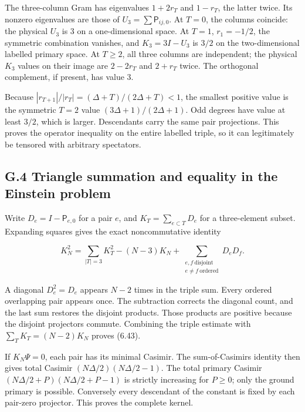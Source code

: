 The three-column Gram has eigenvalues \(1+2r_T\) and \(1-r_T\), the latter twice. Its nonzero eigenvalues are those of \(U_3=\sum\mathsf P_{ij,0}\). At \(T=0\), the columns coincide: the physical \(U_3\) is 3 on a one-dimensional space. At \(T=1\), \(r_1=-1/2\), the symmetric combination vanishes, and \(K_3=3I-U_3\) is \(3/2\) on the two-dimensional labelled primary space. At \(T\ge2\), all three columns are independent; the physical \(K_3\) values on their image are \(2-2r_T\) and \(2+r_T\) twice. The orthogonal complement, if present, has value 3.

Because \(|r_{T+1}|/|r_T|=(\Delta+T)/(2\Delta+T)<1\), the smallest positive value is the symmetric \(T=2\) value \((3\Delta+1)/(2\Delta+1)\). Odd degrees have value at least \(3/2\), which is larger. Descendants carry the same pair projections. This proves the operator inequality on the entire labelled triple, so it can legitimately be tensored with arbitrary spectators.

\hypertarget{g.4-triangle-summation-and-equality-in-the-einstein-problem}{%
\subsection{G.4 Triangle summation and equality in the Einstein problem}\label{g.4-triangle-summation-and-equality-in-the-einstein-problem}}

Write \(D_e=I-\mathsf P_{e,0}\) for a pair \(e\), and \(K_T=\sum_{e\subset T}D_e\) for a three-element subset. Expanding squares gives the exact noncommutative identity

\[
K_N^2=\sum_{|T|=3}K_T^2-(N-3)K_N
+\sum_{\substack{e,f\ \mathrm{disjoint}\\ e\ne f\ \mathrm{ordered}}}D_eD_f.
\tag{G.9}
\]

A diagonal \(D_e^2=D_e\) appears \(N-2\) times in the triple sum. Every ordered overlapping pair appears once. The subtraction corrects the diagonal count, and the last sum restores the disjoint products. Those products are positive because the disjoint projectors commute. Combining the triple estimate with \(\sum_TK_T=(N-2)K_N\) proves (6.43).

If \(K_N\Psi=0\), each pair has its minimal Casimir. The sum-of-Casimirs identity then gives total Casimir \((N\Delta/2)(N\Delta/2-1)\). The total primary Casimir \((N\Delta/2+P)(N\Delta/2+P-1)\) is strictly increasing for \(P\ge0\); only the ground primary is possible. Conversely every descendant of the constant is fixed by each pair-zero projector. This proves the complete kernel.

